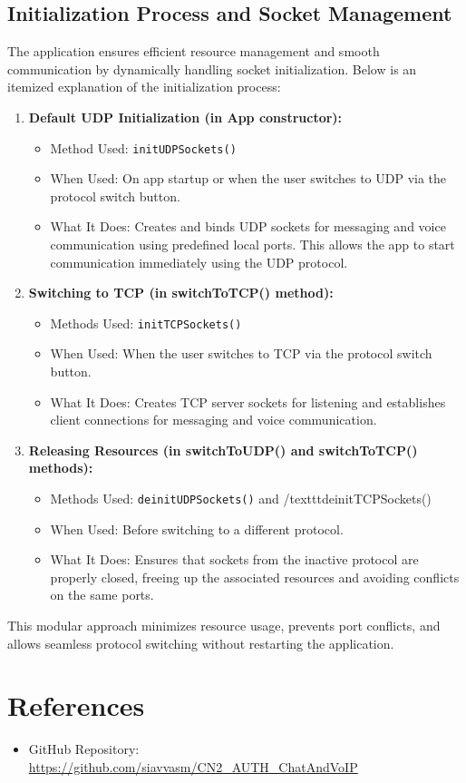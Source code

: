 \documentclass{article}
\begin{document}
\subsection{Initialization Process and Socket Management}
The application ensures efficient resource management and smooth communication by dynamically handling socket initialization. Below is an 
itemized explanation of the initialization process:

\begin{enumerate}
\item \textbf{Default UDP Initialization (in App constructor):}
        \begin{itemize}  
        \item Method Used: \texttt{initUDPSockets()}
        \item When Used: On app startup or when the user switches to UDP via the protocol switch button.
        \item What It Does: Creates and binds UDP sockets for messaging and voice communication using predefined local ports. This allows the app to start 
        communication immediately using the UDP protocol.
        \end{itemize}
\item \textbf{Switching to TCP (in switchToTCP() method):}
        \begin{itemize}
        \item Methods Used: \texttt{initTCPSockets()}
        \item When Used: When the user switches to TCP via the protocol switch button.
        \item What It Does: Creates TCP server sockets for listening and establishes client connections for messaging and voice communication.
        \end{itemize}

\item \textbf{Releasing Resources (in switchToUDP() and switchToTCP() methods):}
        \begin{itemize}
        \item Methods Used: \texttt{deinitUDPSockets()} and /texttt{deinitTCPSockets()} 
        \item When Used: Before switching to a different protocol.
        \item What It Does: Ensures that sockets from the inactive protocol are properly closed, freeing up the associated resources and avoiding conflicts on the same ports.
        \end{itemize}
\end{enumerate}
This modular approach minimizes resource usage, prevents port conflicts, and allows seamless protocol switching without restarting the application.










\section{References}
\begin{itemize}
    \item GitHub Repository: \url{https://github.com/siavvasm/CN2_AUTH_ChatAndVoIP}
\end{itemize}
\end{document}
